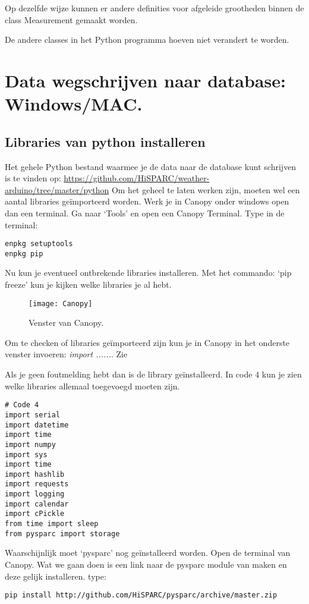 Op dezelfde wijze kunnen er andere definities voor afgeleide grootheden
binnen de class Measurement gemaakt worden. 

De andere classes in het Python programma hoeven niet verandert te worden.


\section{Data wegschrijven naar \hisparc database: Windows/MAC.}

\subsection{Libraries van python installeren}

Het gehele Python bestand waarmee je de data naar de \hisparc database kunt schrijven 
is te vinden op:
\url{https://github.com/HiSPARC/weather-arduino/tree/master/python}
Om het geheel te laten werken zijn, moeten wel een aantal libraries geïmporteerd worden.
Werk je in Canopy onder windows open dan een terminal. Ga naar `Tools' en open 
een Canopy Terminal.
Type in de terminal:
\begin{verbatim}
enpkg setuptools
enpkg pip
\end{verbatim}

Nu kun je eventueel ontbrekende libraries installeren. Met het commando: 
`pip freeze' kun je kijken welke libraries je al hebt. 

\begin{figure}
    \centering
    \texttt{[image: Canopy]}
    \caption{Venster van Canopy.}
   \label{Canopy}
\end{figure}

Om te checken of libraries geïmporteerd zijn kun je in Canopy in het onderste venster
invoeren: \emph{import ......}. Zie 

Als je geen foutmelding hebt dan is de library geïnstalleerd. 
In code 4 kun je zien welke libraries allemaal toegevoegd moeten zijn.
 
\begin{verbatim}
# Code 4
import serial
import datetime
import time
import numpy
import sys
import time
import hashlib
import requests
import logging
import calendar
import cPickle 
from time import sleep
from pysparc import storage

\end{verbatim}

Waarschijnlijk moet `pysparc' nog geïnstalleerd worden. Open de terminal van
Canopy. Wat we gaan doen is een link naar de pysparc module van \hisparc
maken en deze gelijk installeren. type: 
\begin{verbatim} 
pip install http://github.com/HiSPARC/pysparc/archive/master.zip 
\end{verbatim}

